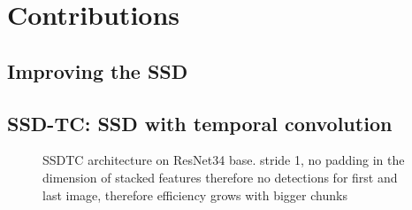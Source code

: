 \chapter{Contributions}

\section{Improving the SSD}

\section{SSD-TC: SSD with temporal convolution}
\begin{figure}
    \centering
    \ssdtc
    \caption[SSDTC architecture]{SSDTC architecture on ResNet34 base. stride 1, no padding in the dimension of stacked features therefore no detections for first and last image, therefore efficiency grows with bigger chunks}
    \label{fig:ssdtc}
\end{figure}


